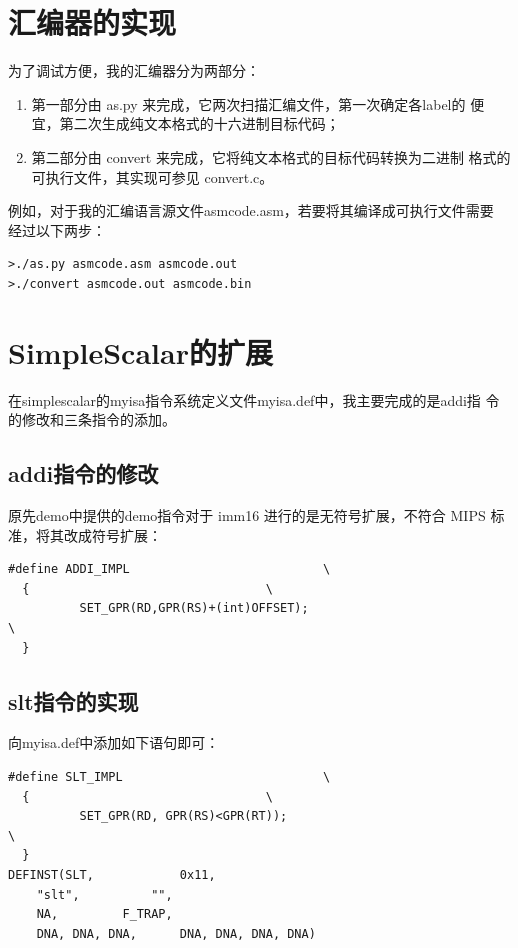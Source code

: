 \documentclass[a4paper,dvipdfm]{ctexart}
\begin{document}
\section{汇编器的实现}
\label{sec:as}

为了调试方便，我的汇编器分为两部分：

\begin{enumerate}
\item 第一部分由 as.py 来完成，它两次扫描汇编文件，第一次确定各label的
  便宜，第二次生成纯文本格式的十六进制目标代码；
\item 第二部分由 convert 来完成，它将纯文本格式的目标代码转换为二进制
  格式的可执行文件，其实现可参见 convert.c。
\end{enumerate}

例如，对于我的汇编语言源文件asmcode.asm，若要将其编译成可执行文件需要
经过以下两步：

\begin{lstlisting}
>./as.py asmcode.asm asmcode.out
>./convert asmcode.out asmcode.bin
\end{lstlisting}

\section{SimpleScalar的扩展}
\label{sec:simplescalar}

在simplescalar的myisa指令系统定义文件myisa.def中，我主要完成的是addi指
令的修改和三条指令的添加。

\subsection{addi指令的修改}
\label{sec:addi}

原先demo中提供的demo指令对于 imm16 进行的是无符号扩展，不符合 MIPS 标
准，将其改成符号扩展：

\begin{lstlisting}
#define ADDI_IMPL							\
  {									\
          SET_GPR(RD,GPR(RS)+(int)OFFSET);                              \
  }
\end{lstlisting}

\subsection{slt指令的实现}
\label{sec:sltimple}

向myisa.def中添加如下语句即可：

\begin{lstlisting}
#define SLT_IMPL							\
  {									\
          SET_GPR(RD, GPR(RS)<GPR(RT));                                 \
  }
DEFINST(SLT,			0x11,
	"slt",			"",
	NA,			F_TRAP,
	DNA, DNA, DNA,		DNA, DNA, DNA, DNA)
\end{lstlisting}
\end{document}
